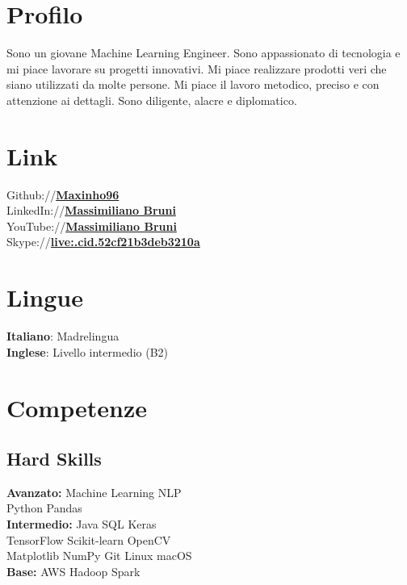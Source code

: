 \documentclass[]{deedy-resume-openfont}
\begin{document}
\begin{minipage}[t]{0.33\textwidth} 


\section{Profilo}
Sono un giovane Machine Learning Engineer. Sono appassionato di tecnologia e mi piace lavorare su progetti innovativi. Mi piace realizzare prodotti veri che siano utilizzati da molte persone. Mi piace il lavoro metodico, preciso e con attenzione ai dettagli. Sono diligente, alacre e diplomatico.
\sectionsep


\section{Link} 
Github://\href{https://github.com/Maxinho96}{\bf Maxinho96} \\
LinkedIn://\href{https://www.linkedin.com/in/massimiliano-bruni-352926120}{\bf Massimiliano Bruni} \\
YouTube://\href{https://www.youtube.com/channel/UCqskrALDsaUvYC8ztJyqCug}{\bf Massimiliano Bruni} \\
Skype://\href{https://join.skype.com/invite/w9MIsgXZsji7}{\bf live:.cid.52cf21b3deb3210a}
\sectionsep


\section{Lingue}
\textbf{Italiano}: Madrelingua \\
\textbf{Inglese}: Livello intermedio (B2)
\sectionsep


\section{Competenze}

\subsection{Hard Skills}
\textbf{Avanzato:} Machine Learning \textbullet{} NLP \\
Python \textbullet{} Pandas \\
\textbf{Intermedio:} Java \textbullet{} SQL \textbullet{} Keras \\
TensorFlow \textbullet{} Scikit-learn \textbullet{} OpenCV \\
Matplotlib \textbullet{} NumPy \textbullet{} Git \textbullet{} Linux \textbullet{} macOS \\
\textbf{Base:} AWS \textbullet{} Hadoop \textbullet{} Spark
\sectionsep


\end{minipage}
\end{document}
